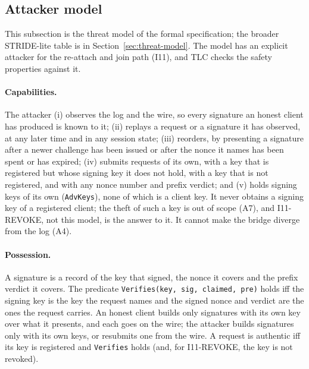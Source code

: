 \subsection{Attacker model}\label{app:attacker}

This subsection is the threat model of the formal specification; the
broader STRIDE-lite table is in Section~\ref{sec:threat-model}. The model has an
explicit attacker for the re-attach and join path (I11), and TLC checks the
safety properties against it.

\paragraph{Capabilities.} The attacker (i) observes the log and the wire, so
every signature an honest client has produced is known to it; (ii) replays a
request or a signature it has observed, at any later time and in any session
state; (iii) reorders, by presenting a signature after a newer challenge has
been issued or after the nonce it names has been spent or has expired;
(iv) submits requests of its own, with a key that is registered but whose
signing key it does not hold, with a key that is not registered, and with any
nonce number and prefix verdict; and (v) holds signing keys of its own
(\texttt{AdvKeys}), none of which is a client key. It never obtains a signing
key of a registered client; the theft of such a key is out of scope (A7), and
I11-REVOKE, not this model, is the answer to it. It cannot make the bridge
diverge from the log (A4).

\paragraph{Possession.} A signature is a record of the key that signed, the
nonce it covers and the prefix verdict it covers. The predicate
\texttt{Verifies(key, sig, claimed, pre)} holds iff the signing key is the
key the request names and the signed nonce and verdict are the ones the
request carries. An honest client builds only signatures with its own key
over what it presents, and each goes on the wire; the attacker builds
signatures only with its own keys, or resubmits one from the wire. A request
is authentic iff its key is registered and \texttt{Verifies} holds (and, for
I11-REVOKE, the key is not revoked).

